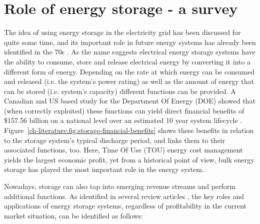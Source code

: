 \section{Role of energy storage - a survey}
\label{ch-literature:sec:role-of-energy-storage-a-survey}



The idea of using energy storage in the electricity grid has been discussed for quite some time, and its important role in future energy systems has already been identified in the 70s \cite{Kalhammer1979}.
As the name suggests electrical energy storage systems have the ability to consume, store and release electrical energy by converting it into a different form of energy.
Depending on the rate at which energy can be consumed and released (i.e. the system's power rating) as well as the amount of energy that can be stored (i.e. system's capacity) different functions can be provided.
A Canadian and US based study for the Department Of Energy (DOE) showed that (when correctly exploited) these functions can yield direct financial benefits of \$157.56 billion on a national level over an estimated 10 year system lifecycle \cite{Eyer2010a}.
Figure~\ref{ch-literature:fig:storage-financial-benefits} shows these benefits in relation to the storage system's typical discharge period, and links them to their associated functions, too.
Here, Time Of Use (TOU) energy cost management yields the largest economic profit, yet from a historical point of view, bulk energy storage has played the most important role in the energy system.

Nowadays, storage can also tap into emerging revenue streams and perform additional functions.
As identified in several review articles \cite{Chen2009, Katsanevakis2017, Guney2017}, the key roles and applications of energy storage systems, regardless of profitability in the current market situation, can be identified as follows:

